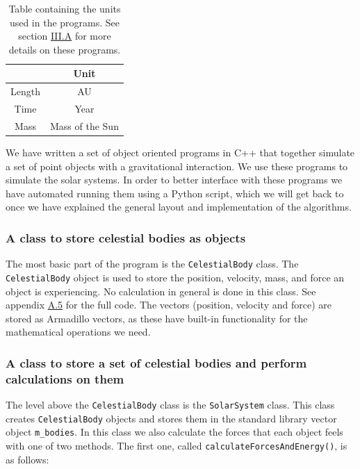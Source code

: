 \documentclass[reprint,english,notitlepage]{revtex4-1}  %
\begin{document}
\begin{table}[H]
\caption{Table containing the units used in the programs. See section \hyperref[sec:III:a]{III.A} for more details on these programs.}
\begin{tabular}{|c|c|}
\hline
 & Unit \\
\hline
Length & AU \\
Time & Year \\
Mass & Mass of the Sun \\
\hline
\end{tabular}
\label{table:III:a:i}
\end{table}

We have written a set of object oriented programs in C++ that together simulate a set of point objects with a gravitational interaction. We use these programs to simulate the solar systems. In order to better interface with these programs we have automated running them using a Python script, which we will get back to once we have explained the general layout and implementation of the algorithms.

\subsubsection{A class to store celestial bodies as objects} \label{sec:III:a:1}

The most basic part of the program is the \verb+CelestialBody+ class. The \verb+CelestialBody+ object is used to store the position, velocity, mass, and force an object is experiencing. No calculation in general is done in this class. See appendix \hyperref[A.5]{A.5} for the full code. The vectors (position, velocity and force) are stored as Armadillo \citep{Armadillo} vectors, as these have built-in functionality for the mathematical operations we need.

\subsubsection{A class to store a set of celestial bodies and perform calculations on them} \label{sec:III:a:2}

The level above the \verb+CelestialBody+ class is the \verb+SolarSystem+ class. This class creates \verb+CelestialBody+ objects and stores them in the standard library vector object \verb+m_bodies+. In this class we also calculate the forces that each object feels with one of two methods. The first one, called \verb+calculateForcesAndEnergy()+, is as follows:
\end{document}
